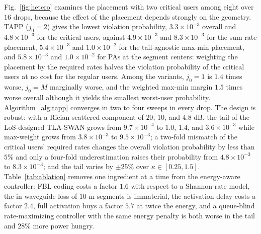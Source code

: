 \documentclass[journal]{IEEEtran}
\begin{document}
Fig.~\ref{fig:hetero} examines the placement with two critical users among eight over $16$ drops, because the effect of the placement depends strongly on the geometry. TAPP ($j_0=2$) gives the lowest violation probability, $3.3\times10^{-3}$ overall and $4.8\times10^{-3}$ for the critical users, against $4.9\times10^{-3}$ and $8.3\times10^{-3}$ for the sum-rate placement, $5.4\times10^{-3}$ and $1.0\times10^{-2}$ for the tail-agnostic max-min placement, and $5.8\times10^{-3}$ and $1.0\times10^{-2}$ for PAs at the segment centers: weighting the placement by the required rates halves the violation probability of the critical users at no cost for the regular users. Among the variants, $j_0=1$ is $1.4$ times worse, $j_0=M$ marginally worse, and the weighted max-min margin $1.5$ times worse overall although it yields the smallest worst-user probability. Algorithm~\ref{alg:tapp} converges in two to four sweeps in every drop. The design is robust: with a Rician scattered component of $20$, $10$, and $4.8$ dB, the tail of the LoS-designed TLA-SWAN grows from $9.7\times10^{-4}$ to $1.0$, $1.4$, and $3.6\times10^{-3}$ while max-weight grows from $3.8\times10^{-3}$ to $9.5\times10^{-3}$; a two-fold mismatch of the critical users' required rates changes the overall violation probability by less than $5\%$ and only a four-fold underestimation raises their probability from $4.8\times10^{-3}$ to $8.3\times10^{-3}$; and the tail varies by $\pm25\%$ over $\kappa\in[0.25,1.5]$. Table~\ref{tab:ablation} removes one ingredient at a time from the energy-aware controller: FBL coding costs a factor $1.6$ with respect to a Shannon-rate model, the in-waveguide loss of $10$-m segments is immaterial, the activation delay costs a factor $2.4$, full activation buys a factor $5.7$ at twice the energy, and a queue-blind rate-maximizing controller with the same energy penalty is both worse in the tail and $28\%$ more power hungry.

\end{document}
